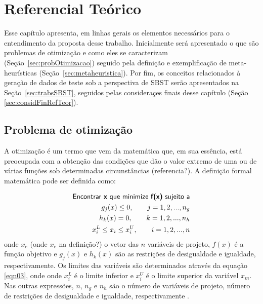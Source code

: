 
\chapter[Referencial Teórico]{Referencial Teórico}
\label{referencialteorico}

Esse capítulo apresenta, em linhas gerais os elementos necessários para o entendimento da proposta desse trabalho. Inicialmente será apresentado o que são problemas de otimização e como eles se caracterizam (Seção~\ref{sec:probOtimizacao}) seguido pela definição e exemplificação de meta-heurísticas (Seção~\ref{sec:metaheuristica}). Por fim, os conceitos relacionados à geração de dados de teste sob a perspectiva de SBST serão apresentados na Seção~\ref{sec:trabsSBST}, seguidos pelas consideraçes finais desse capítulo (Seção \ref{sec:considFinRefTeor}).  




\section{Problema de otimização \label{sec:probOtimizacao}}

A otimização é um termo que vem da matemática que, em sua essência, está
preocupada com a obtenção das condições que dão o valor extremo de uma ou de
várias funções sob determinadas circunstâncias (referencia?). A definição formal
matemática pode ser definida como: 

\begin{eqnarray}
\label{eqn01}
	 \textsf{Encontrar \textbf{x} que minimize \textbf{f(x)} sujeito a} \nonumber \\
     g_j(x) \leq 0, \qquad j = 1, 2, ..., n_g \\
\label{eqn02}
      h_k(x) = 0, \qquad k = 1, 2, ..., n_h \\
\label{eqn03}
      x_{i}^{L} \leq x_i \leq x_{i}^{U}, \qquad i = 1, 2, ..., n 
\end{eqnarray}
onde $x_{e}$ (onde $x_e$ na definição?) o vetor das $n$ variáveis de projeto, $f(x)$ é a função objetivo e $g_{j}(x)$ e $h_{k}(x)$ são as restrições de desigualdade e igualdade, respectivamente. Os limites das variáveis são determinados através da equação \ref{eqn03}, onde onde $x_{i}^{L}$ é o limite inferior e $x_{i}^{U}$ é o limite superior da variável $x_{m}$. Nas outras expressões, $n$, $n_{g}$ e $n_{h}$ são o número de variáveis de projeto, número de restrições de desigualdade e igualdade, respectivamente \cite{gandomi2013metaheuristic}.  

